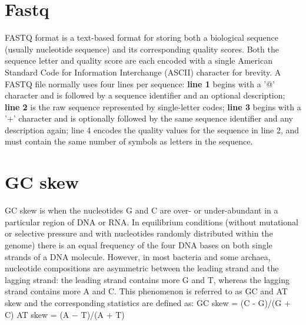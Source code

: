\documentclass[11pt]{article}
\begin{document}
\begin{sloppypar}
\section{Fastq}
FASTQ format is a text-based format for storing both a biological sequence (usually nucleotide sequence) and its corresponding quality scores. 
Both the sequence letter and quality score are each encoded with a single American Standard Code for Information Interchange (ASCII) character for brevity. 
A FASTQ file normally uses four lines per sequence: 
\textbf{line 1} begins with a '@' character and is followed by a sequence identifier and an optional description; 
\newline
\textbf{line 2} is the raw sequence represented by single-letter codes; 
\newline
\textbf{line 3} begins with a '+' character and is optionally followed by the same sequence identifier and any description again; 
line 4 encodes the quality values for the sequence in line 2, and must contain the same number of symbols as letters in the sequence.

\section{GC skew}
GC skew is when the nucleotides G and C are over- or under-abundant in a particular region of DNA or RNA.
In equilibrium conditions (without mutational or selective pressure and with nucleotides randomly distributed within the genome) there is an equal frequency of the four DNA bases on both single strands of a DNA molecule. 
However, in most bacteria and some archaea, nucleotide compositions are asymmetric between the leading strand and the lagging strand: 
the leading strand contains more G and T, whereas the lagging strand contains more A and C. 
This phenomenon is referred to as GC and AT skew and the corresponding statistics are defined as:
\newline
GC skew = (C - G)/(G + C)
\newline
AT skew = (A − T)/(A + T) 


\end{sloppypar}
\end{document}
